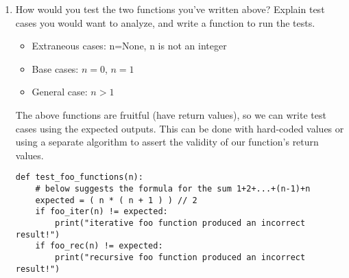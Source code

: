 \begin{enumerate}
\item How would you test the two functions you've written above? Explain test cases you would want to analyze, and write a function to run the tests.

\begin{answer}
\begin{itemize}
\item Extraneous cases: n=None, n is not an integer
\item Base cases: $n=0$, $n=1$
\item General case: $n > 1$
\end{itemize}
The above functions are fruitful (have return values), so we can write test cases using the expected outputs. This can be done with hard-coded values or using a separate algorithm
to assert the validity of our function's return values.
\begin{lstlisting}
def test_foo_functions(n):
	# below suggests the formula for the sum 1+2+...+(n-1)+n
	expected = ( n * ( n + 1 ) ) // 2
	if foo_iter(n) != expected:
		print("iterative foo function produced an incorrect result!")
	if foo_rec(n) != expected:
		print("recursive foo function produced an incorrect result!")
\end{lstlisting}
\end{answer}

\end{enumerate}




